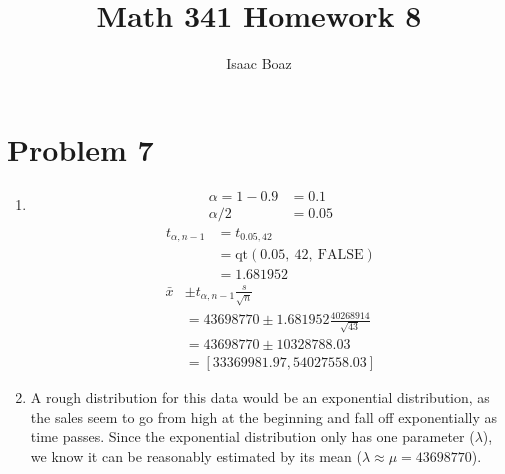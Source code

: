 \documentclass{article}
\title{\vspace{4em}Math 341 Homework 8}
\author{Isaac Boaz}
\begin{document}
\maketitle

\pagebreak

\section*{Problem 7}
\begin{enumerate}[label=(\alph*)]
    \item \begin{align*}
              \alpha = 1 - 0.9 & = 0.1  \\
              \alpha/2         & = 0.05
          \end{align*}
          \begin{align*}
              t_{\alpha, n-1} & = t_{0.05, 42}                        \\
                              & = \text{qt}(0.05,\ 42,\ \text{FALSE}) \\
                              & = 1.681952
          \end{align*}
          \begin{align*}
              \bar{x} & \pm t_{\alpha, n-1} \frac{s}{\sqrt{n}}             \\
                      & = 43698770 \pm 1.681952 \frac{40268914}{\sqrt{43}} \\
                      & = 43698770 \pm 10328788.03                         \\
                      & = [33369981.97, 54027558.03]
          \end{align*}
    \item
          \setlength{\columnsep}{-1.6in}
          \begin{multicols}{2}
              A rough distribution for this data would be an exponential distribution, as the sales seem to go from high at the beginning and fall off exponentially as time passes.
              Since the exponential distribution only has one parameter (\(\lambda\)), we know it can be reasonably estimated by its mean (\(\lambda \approx \mu = 43698770\)).
              \columnbreak

\end{multicols}
\end{enumerate}
\end{document}

